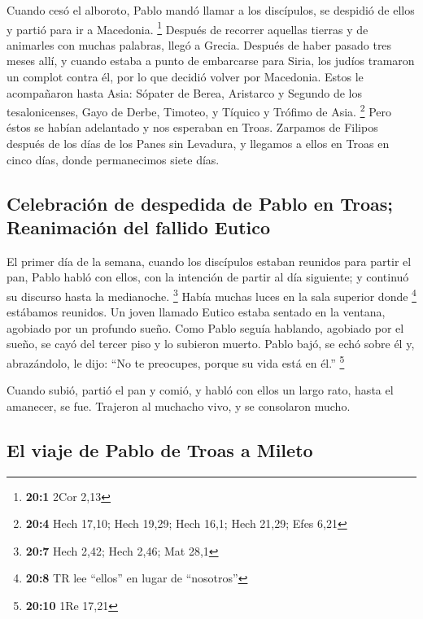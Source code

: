  Cuando cesó el alboroto, Pablo mandó llamar a los
discípulos, se despidió de ellos y partió para ir a Macedonia.
\footnote{\textbf{20:1} 2Cor 2,13}  Después de recorrer
aquellas tierras y de animarles con muchas palabras, llegó a Grecia.
 Después de haber pasado tres meses allí, y cuando estaba
a punto de embarcarse para Siria, los judíos tramaron un complot contra
él, por lo que decidió volver por Macedonia.  Estos le
acompañaron hasta Asia: Sópater de Berea, Aristarco y Segundo de los
tesalonicenses, Gayo de Derbe, Timoteo, y Tíquico y Trófimo de Asia.
\footnote{\textbf{20:4} Hech 17,10; Hech 19,29; Hech 16,1; Hech 21,29;
  Efes 6,21}  Pero éstos se habían adelantado y nos
esperaban en Troas.  Zarpamos de Filipos después de los
días de los Panes sin Levadura, y llegamos a ellos en Troas en cinco
días, donde permanecimos siete días.

\hypertarget{celebraciuxf3n-de-despedida-de-pablo-en-troas-reanimaciuxf3n-del-fallido-eutico}{%
\subsection{Celebración de despedida de Pablo en Troas; Reanimación del
fallido
Eutico}\label{celebraciuxf3n-de-despedida-de-pablo-en-troas-reanimaciuxf3n-del-fallido-eutico}}

 El primer día de la semana, cuando los discípulos estaban
reunidos para partir el pan, Pablo habló con ellos, con la intención de
partir al día siguiente; y continuó su discurso hasta la medianoche.
\footnote{\textbf{20:7} Hech 2,42; Hech 2,46; Mat 28,1} 
Había muchas luces en la sala superior donde \footnote{\textbf{20:8} TR
  lee ``ellos'' en lugar de ``nosotros''} estábamos reunidos.
 Un joven llamado Eutico estaba sentado en la ventana,
agobiado por un profundo sueño. Como Pablo seguía hablando, agobiado por
el sueño, se cayó del tercer piso y lo subieron muerto. 
Pablo bajó, se echó sobre él y, abrazándolo, le dijo: ``No te preocupes,
porque su vida está en él.'' \footnote{\textbf{20:10} 1Re 17,21}

 Cuando subió, partió el pan y comió, y habló con ellos
un largo rato, hasta el amanecer, se fue.  Trajeron al
muchacho vivo, y se consolaron mucho.

\hypertarget{el-viaje-de-pablo-de-troas-a-mileto}{%
\subsection{El viaje de Pablo de Troas a
Mileto}\label{el-viaje-de-pablo-de-troas-a-mileto}}

